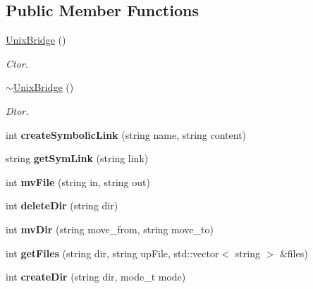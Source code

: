 \subsection*{Public Member Functions}
\begin{DoxyCompactItemize}
\item 
\hypertarget{classUnixBridge_a89812476ce97c7bdc4ae8e6160e583bb}{\hyperlink{classUnixBridge_a89812476ce97c7bdc4ae8e6160e583bb}{Unix\-Bridge} ()}\label{classUnixBridge_a89812476ce97c7bdc4ae8e6160e583bb}

\begin{DoxyCompactList}\small\item\em Ctor. \end{DoxyCompactList}\item 
\hypertarget{classUnixBridge_a1902ba975703ecfe5eecd810c39c671d}{\hyperlink{classUnixBridge_a1902ba975703ecfe5eecd810c39c671d}{$\sim$\-Unix\-Bridge} ()}\label{classUnixBridge_a1902ba975703ecfe5eecd810c39c671d}

\begin{DoxyCompactList}\small\item\em Dtor. \end{DoxyCompactList}\item 
\hypertarget{classUnixBridge_ab27429b32f913986d0aac1c69bcba6f3}{int {\bfseries create\-Symbolic\-Link} (string name, string content)}\label{classUnixBridge_ab27429b32f913986d0aac1c69bcba6f3}

\item 
\hypertarget{classUnixBridge_a818d57b1f182e3fe4dcf84eb5b6e5df1}{string {\bfseries get\-Sym\-Link} (string link)}\label{classUnixBridge_a818d57b1f182e3fe4dcf84eb5b6e5df1}

\item 
\hypertarget{classUnixBridge_adc00f8d0d5dd0a3b2cbb654172ec8902}{int {\bfseries mv\-File} (string in, string out)}\label{classUnixBridge_adc00f8d0d5dd0a3b2cbb654172ec8902}

\item 
\hypertarget{classUnixBridge_a721962a7dd9e4654d32c171854f7fbce}{int {\bfseries delete\-Dir} (string dir)}\label{classUnixBridge_a721962a7dd9e4654d32c171854f7fbce}

\item 
\hypertarget{classUnixBridge_a9c44f87fedf0e1933e084c4f9c8571dc}{int {\bfseries mv\-Dir} (string move\-\_\-from, string move\-\_\-to)}\label{classUnixBridge_a9c44f87fedf0e1933e084c4f9c8571dc}

\item 
\hypertarget{classUnixBridge_a92f44a047ec7bb277151363bea147054}{int {\bfseries get\-Files} (string dir, string up\-File, std\-::vector$<$ string $>$ \&files)}\label{classUnixBridge_a92f44a047ec7bb277151363bea147054}

\item 
\hypertarget{classUnixBridge_a1357f426d25f8093b1f8ccc1bb01be0e}{int {\bfseries create\-Dir} (string dir, mode\-\_\-t mode)}\label{classUnixBridge_a1357f426d25f8093b1f8ccc1bb01be0e}

\end{DoxyCompactItemize}
